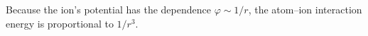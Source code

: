 Because the ion's potential has the dependence $\varphi\sim1/r$, the atom--ion interaction energy is proportional to $1/r^3$.

